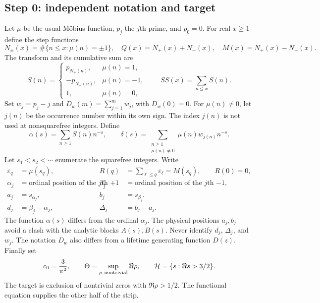 \subsection{Step 0: independent notation and target}
\label{subsec:a12-definitions}
Let $\mu$ be the usual M\"obius function, $p_j$ the $j$th prime, and $p_0=0$.
For real $x\ge1$ define the step functions
\begin{equation}
\label{eq:a12-counts}
N_\pm(x)=\#\{n\le x:\mu(n)=\pm1\},\quad
Q(x)=N_+(x)+N_-(x),\quad M(x)=N_+(x)-N_-(x).
\end{equation}
The transform and its cumulative sum are
\begin{equation}
\label{eq:a12-S}
S(n)=
\begin{cases}
p_{N_+(n)},&\mu(n)=1,\\
-p_{N_-(n)},&\mu(n)=-1,\\
1,&\mu(n)=0,
\end{cases}
\qquad SS(x)=\sum_{n\le x}S(n).
\end{equation}
Set $w_j=p_j-j$ and $D_w(m)=\sum_{j=1}^m w_j$, with $D_w(0)=0$.
For $\mu(n)\ne0$, let $j(n)$ be the occurrence number within its own sign.
The index $j(n)$ is not used at nonsquarefree integers. Define
\begin{equation}
\label{eq:a12-series}
\alpha(s)=\sum_{n\ge1}S(n)n^{-s},\qquad
\delta(s)=\sum_{\substack{n\ge1\\\mu(n)\ne0}}\mu(n)w_{j(n)}n^{-s}.
\end{equation}
Let $s_1<s_2<\cdots$ enumerate the squarefree integers. Write
\begin{equation}
\label{eq:a12-pairs}
\begin{aligned}
\varepsilon_q&=\mu(s_q),&
R(q)&=\sum_{\ell\le q}\varepsilon_\ell=M(s_q),\qquad R(0)=0,\\
\alpha_j&=\text{ordinal position of the $j$th $+1$},&
\beta_j&=\text{ordinal position of the $j$th $-1$},\\
a_j&=s_{\alpha_j},&b_j&=s_{\beta_j},\\
d_j&=\beta_j-\alpha_j,&\Delta_j&=b_j-a_j.
\end{aligned}
\end{equation}
The function $\alpha(s)$ differs from the ordinal $\alpha_j$.
The physical positions $a_j,b_j$ avoid a clash with the analytic blocks
$A(s),B(s)$. Never identify $d_j$, $\Delta_j$, and $w_j$.
The notation $D_w$ also differs from a lifetime generating function $D(z)$.
Finally set
\begin{equation}
\label{eq:a12-H}
c_0=\frac3{\pi^2},\qquad
\Theta=\sup_{\rho\ {\rm nontrivial}}\Re\rho,\qquad
\mathcal H=\{s:\Re s>3/2\}.
\end{equation}
The target is exclusion of nontrivial zeros with $\Re\rho>1/2$.
The functional equation supplies the other half of the strip.


